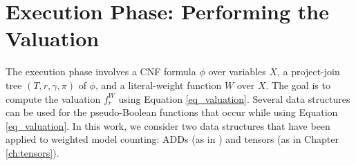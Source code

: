 \section{Execution Phase: Performing the Valuation}
\label{sec_execution}

The execution phase involves a CNF formula $\phi$ over variables $X$, a project-join tree $(T, r, \gamma, \pi)$ of $\phi$, and a literal-weight function $W$ over $X$.
The goal is to compute the valuation $f^W_r$ using Equation \eqref{eq_valuation}.
Several data structures can be used for the pseudo-Boolean functions that occur while using Equation \eqref{eq_valuation}.
In this work, we consider two data structures that have been applied to weighted model counting: ADDs (as in \cite{DPV20}) and tensors (as in Chapter \ref{ch:tensors}).







